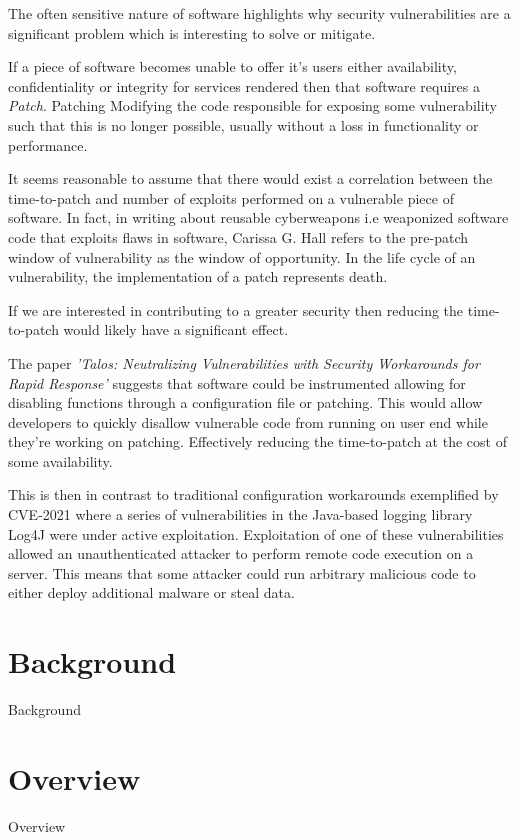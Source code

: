 \documentclass[a4paper,11pt]{report}
\begin{document}
The often sensitive nature of software highlights why security vulnerabilities are a significant problem which is interesting to solve or mitigate.

If a piece of software becomes unable to offer it's users either availability, confidentiality or integrity for services rendered then that software requires a \textit{Patch}. Patching Modifying the code responsible for exposing some vulnerability such that this is no longer possible, usually without a loss in functionality or performance.

It seems reasonable to assume that there would exist a correlation between the time-to-patch and number of exploits performed on a vulnerable piece of software. In fact, in writing about reusable cyberweapons i.e weaponized software code that exploits flaws in software, Carissa G. Hall refers to the pre-patch window of vulnerability as the window of opportunity. In the life cycle of an vulnerability, the implementation of a patch represents death.~\cite{hall2017time}

If we are interested in contributing to a greater security then reducing the time-to-patch would likely have a significant effect.

The paper \textit{'Talos: Neutralizing Vulnerabilities with Security Workarounds for Rapid Response'} suggests that software could be instrumented allowing for disabling functions through a configuration file or patching. This would allow developers to quickly disallow vulnerable code from running on user end while they're working on patching. Effectively reducing the time-to-patch at the cost of some availability.

This is then in contrast to traditional configuration workarounds exemplified by CVE-2021 where a series of vulnerabilities in the Java-based logging library Log4J were under active exploitation. Exploitation of one of these vulnerabilities allowed an unauthenticated attacker to perform remote code execution on a server. This means that some attacker could run arbitrary malicious code to either deploy additional malware or steal data.





\chapter{Background}
Background
\chapter{Overview}
Overview
\end{document}
